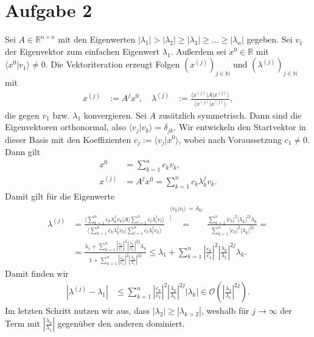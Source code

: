 \documentclass[english, parskip=full]{scrartcl}
\newcommand{\kom}{}
\newcommand{\brak}{}
\newcommand{\braket}{}
\newcommand{\kla}{}
\begin{document}
\section*{Aufgabe 2}
Sei $A\in\mathbb{R}^{n\times n}$ mit den Eigenwerten $|\lambda_1|>|\lambda_2|\ge |\lambda_3|\ge \dots\ge |\lambda_n|$ gegeben.
Sei $v_1$ der Eigenvektor zum einfachen Eigenwert $\lambda_1$.
Außerdem sei $x^0\in\mathbb{R}$ mit $\brak\langle x^0 | v_1 \rangle \neq 0$.
Die Vektoriteration erzeugt Folgen $\kla\left( x^{(j)} \right)_{j\in\mathbb{N}}$ und $\kla\left( \lambda^{(j)} \right)_{j\in\mathbb{N}}$ mit
\begin{align}
x^{(j)} &:= A^j x^0, \quad \lambda^{(j)} &:= \frac{\braket\langle x^{(j)} | A | x^{(j)} \rangle}{\brak\langle x^{(j)} | x^{(j)} \rangle},
\end{align}
die gegen $v_1$ bzw. $\lambda_1$ konvergieren.
Sei $A$ zusätzlich symmetrisch.
Dann sind die Eigenvektoren orthonormal, also $\brak\langle v_j | v_k \rangle = \delta_{jk}$.
Wir entwickeln den Startvektor in dieser Basis mit den Koeffizienten $c_j := \brak\langle v_j | x^0 \rangle$, wobei nach Voraussetzung $c_1\neq 0$.
Dann gilt
\begin{align}
x^0 &= \sum_{k=1}^n c_kv_k,\\
x^{(j)} &= A^jx^0 = \sum_{k=1}^n c_k\lambda_k^j v_k.
\end{align}
Damit gilt für die Eigenwerte
\begin{align}
\lambda^{(j)} &= \frac{\braket\langle \sum_{k=1}^n c_k\lambda_k^jv_k | A | \sum_{l=1}^n c_l\lambda_l^jv_l \rangle}{\brak\langle \sum_{k=1}^n c_k\lambda_k^jv_k  | \sum_{l=1}^n c_l\lambda_l^{j}v_k \rangle} \kom\overset{\substack{{\brak\langle v_k | v_l \rangle\,=\,\delta_{kl}} \\ |}}{=} \frac{\sum_{k=1}^n |c_k|^2|\lambda_k|^{2j}\lambda_k}{\sum_{k=1}^n |c_k|^2|\lambda_k|^{2j}} = \\
&= \frac{\lambda_1 + \sum_{k=1}^n \left\vert \frac{c_k}{c_1}\right\vert^2 \left\vert \frac{\lambda_k}{\lambda_1} \right\vert^{2j}\lambda_k}{1 + \sum_{k=1}^n \left\vert \frac{c_k}{c_1} \right\vert^2 \left\vert \frac{\lambda_k}{\lambda_1} \right\vert^{2j}} \le \lambda_1 + \sum_{k=1}^n \left\vert \frac{c_k}{c_1}\right\vert^2 \left\vert \frac{\lambda_k}{\lambda_1} \right\vert^{2j}\lambda_k.
\end{align}
Damit finden wir
\begin{align}
|\lambda^{(j)} - \lambda_1| &\le \sum_{k=1}^n \left\vert \frac{c_k}{c_1}\right\vert^2 \left\vert \frac{\lambda_k}{\lambda_1} \right\vert^{2j}|\lambda_k| \in\mathcal{O}\kla\left( \left\vert \frac{\lambda_2}{\lambda_1} \right\vert^{2j} \right).
\end{align}
Im letzten Schritt nutzen wir aus, dass $|\lambda_2| \ge |\lambda_{k>2}|$, weshalb für $j\rightarrow\infty$ der Term mit $\left\vert \frac{\lambda_2}{\lambda_1} \right\vert$ gegenüber den anderen dominiert.
\end{document}
